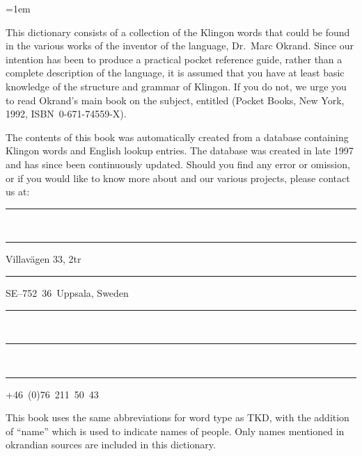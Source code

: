 %
%
%


\parindent=1em                                  %

\raggedbottom



\noindent This dictionary consists of a collection of the Klingon
words that could be found in the various works of the inventor of the
language, Dr.\ Marc Okrand. Since our intention has been to produce a
practical pocket reference guide, rather than a complete description
of the language, it is assumed that you have at least basic knowledge
of the structure and grammar of Klingon. If you do not, we urge you to
read Okrand's main book on the subject, entitled  (Pocket Books, New York, 1992, ISBN~0-671-74559-X).

The contents of this book was automatically created from a database
containing \fromkliwords{} Klingon words and \tokliwords{} English
lookup entries. The database was created in late 1997 and has since
been continuously updated. Should you find any error or omission, or
if you would like to know more about 
and our various projects, please contact us at:

\vspace{3mm}%
\noindent\parbox[t]{.5\textwidth}{%
  \rule{1cm}{0mm}\\
  \rule{1cm}{0mm}Villavägen 33, 2tr\\
  \rule{1cm}{0mm}SE--752~36~Uppsala, Sweden%
}%
\parbox[t]{.5\textwidth}{%
  \rule{1cm}{0mm}\\
  \rule{1cm}{0mm}\\
  \rule{1cm}{0mm}+46~(0)76~211~50~43%
}



\noindent This book uses the same abbreviations for word type as TKD, with the
addition of ``name'' which is used to indicate names of people. Only names
mentioned in okrandian sources are included in this dictionary.

